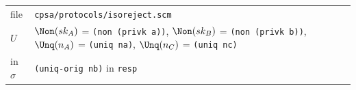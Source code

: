 \par\smallskip\noindent\begin{tabular}{@{}l p{}@{}}
file & \texttt{cpsa/protocols/isoreject.scm}\\
$U$ & $\Non(sk_A)$ = \texttt{(non (privk a))}, $\Non(sk_B)$ = \texttt{(non (privk b))}, $\Unq(n_A)$ = \texttt{(uniq na)}, $\Unq(n_C)$ = \texttt{(uniq nc)}\\
in $\sigma$ & \texttt{(uniq-orig nb)} in \texttt{resp}\\
\end{tabular}

